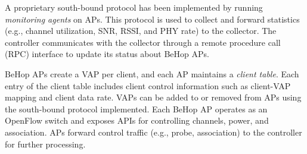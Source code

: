 A proprietary south-bound protocol has been implemented by running \textit{monitoring agents} on APs.
This protocol is used to collect and forward statistics (e.g., channel utilization, SNR, RSSI, and PHY rate) to the collector.
The controller communicates with the collector through a remote procedure call (RPC) interface to update its status about BeHop APs. 

BeHop APs create a VAP per client, and each AP maintains a \textit{client table}.
Each entry of the client table includes client control information such as client-VAP mapping and client data rate. 
VAPs can be added to or removed from APs using the south-bound protocol implemented.
Each BeHop AP operates as an OpenFlow switch and exposes APIs for controlling channels, power, and association.
APs forward control traffic (e.g., probe, association) to the controller for further processing.



%


